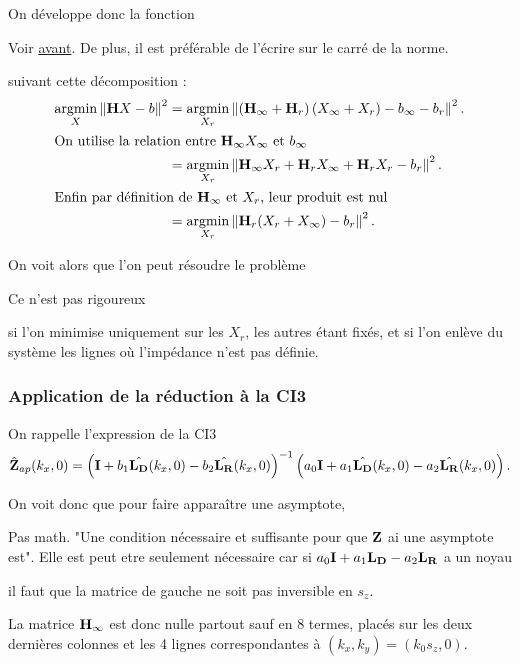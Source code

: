 On développe donc la fonction
\begin{REM}
  Voir \hyperlink{REMfonction}{avant}.
  De plus, il est préférable de l'écrire sur le carré de la norme.
\end{REM}
suivant cette décomposition :
\begin{align*}
{\underset{X}{\operatorname{argmin}}}\left\rVert {\mathbf{H}} X - {b} \right \rVert^2 &= {\underset{X_r}{\operatorname{argmin}}}\left\rVert \left({\mathbf{H}}_\infty + {\mathbf{H}}_r\right)\left( X_\infty + X_r \right) - {b}_\infty - {b}_r \right \rVert^2.
\\
\intertext{On utilise la relation entre \({\mathbf{H}}_\infty X_\infty\) et \({b}_\infty\)}
&=  {\underset{X_r}{\operatorname{argmin}}}\left\rVert {\mathbf{H}}_\infty X_r + {\mathbf{H}}_r X_\infty + {\mathbf{H}}_r X_r - {b}_r \right \rVert^2.
\\
\intertext{Enfin par définition de \({\mathbf{H}}_\infty\) et \(X_r\), leur produit est nul}
&= {\underset{X_r}{\operatorname{argmin}}} \left\rVert {\mathbf{H}}_r ( X_r + X_\infty)- {b}_r \right \rVert^2.
\end{align*}

On voit alors que l'on peut résoudre le problème
\begin{REM}
  Ce n'est pas rigoureux
\end{REM}
si l'on minimise uniquement sur les \(X_r\), les autres étant fixés, et si l'on enlève du système les lignes où l'impédance n'est pas définie.

\subsubsection{Application de la réduction à la CI3}

On rappelle l'expression de la CI3
\begin{equation*}
  \hat{\mathbf{Z}}_{ap}(k_x,0) = \left(\mathbf{I} + b_1 \hat{\mathbf{L_D}}(k_x,0) - b_2 \hat{\mathbf{L_R}}(k_x,0) \right)^{-1}\left(a_0\mathbf{I} + a_1 \hat{\mathbf{L_D}}(k_x,0) - a_2 \hat{\mathbf{L_R}}(k_x,0) \right).
\end{equation*}

On voit donc que pour faire apparaître une asymptote,
\begin{REM}
  Pas math. "Une condition nécessaire et suffisante pour que \(\mathbf{Z}\) ai une asymptote est". Elle est peut etre seulement nécessaire car si \(a_0\mathbf{I} + a_1\mathbf{L_D} -a_2\mathbf{L_R}\) a un noyau
\end{REM}
il faut que la matrice de gauche ne soit pas inversible en \(s_z\).

La matrice \({\mathbf{H}}_\infty\) est donc nulle partout sauf en 8 termes, placés sur les deux dernières colonnes et les 4 lignes correspondantes à \((k_x,k_y)=(k_0 s_z,0)\).

